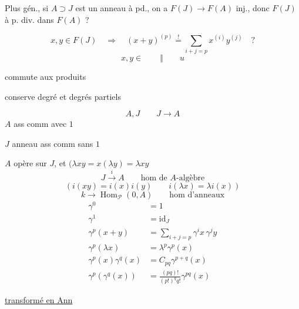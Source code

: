 
Plus gén., si $A\supset J$ est un anneau à pd., on a $F(J)\longrightarrow F(A)$ inj., donc $F(J)$ à p. div. dans $F(A)$ ?


\[
x,y\in F(J)\quad\Longrightarrow\quad
(x+y)^{(p)}\overset{!}{=}\sum_{i+j=p}x^{(i)}y^{(j)}\quad?
\]
\[x,y\in\qquad\Vert\qquad u\]

commute aux produits\par
conserve degré et degrés partiels

\[
A,J\qquad J\longrightarrow A
\]
$A$   ass comm avec $1$\par
$J$ anneau ass comm sans $1$\par
$A$ opère sur $J$, et $(\lambda xy=x(\lambda y)=\lambda xy$
\[
J\xrightarrow{i} A\qquad\text{hom de }A\text{-}\text{algèbre}
\]
\[
(i(xy)=i(x)i(y)\qquad i(\lambda x)=\lambda i(x))
\]
\[
k\longrightarrow\operatorname{Hom}_{\mathcal P}(0,A)\qquad\text{hom d'anneaux}
\]
\[
\begin{aligned}
\gamma^0&=1\\
\gamma^1&=\mathrm{id}_J\\
\gamma^p(x+y)&=\sum_{i+j=p}\gamma^i x\,\gamma^j y\\
\gamma^p(\lambda x)&=\lambda^p\gamma^p(x)\\
\gamma^p(x)\gamma^q(x)&=C_{pq}\gamma^{p+q}(x)\\
\gamma^p(\gamma^q(x))&=\frac{(pq)!}{(p!)^q q!}\gamma^{pq}(x)
\end{aligned}
\]

\uline{transformé en Ann}

